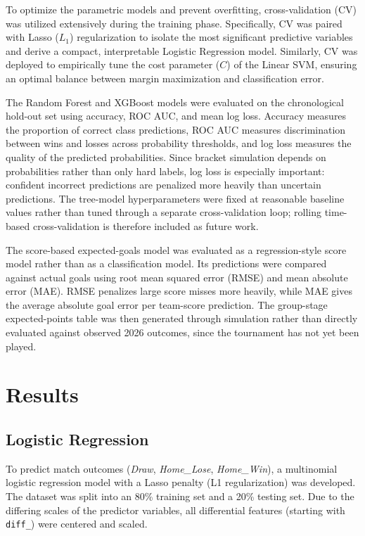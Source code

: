 \documentclass[11pt]{article}
\begin{document}
To optimize the parametric models and prevent overfitting, cross-validation (CV) was utilized extensively during the training phase. Specifically, CV was paired with Lasso ($L_1$) regularization to isolate the most significant predictive variables and derive a compact, interpretable Logistic Regression model. Similarly, CV was deployed to empirically tune the cost parameter ($C$) of the Linear SVM, ensuring an optimal balance between margin maximization and classification error.

The Random Forest and XGBoost models were evaluated on the chronological hold-out set using accuracy, ROC AUC, and mean log loss. Accuracy measures the proportion of correct class predictions, ROC AUC measures discrimination between wins and losses across probability thresholds, and log loss measures the quality of the predicted probabilities. Since bracket simulation depends on probabilities rather than only hard labels, log loss is especially important: confident incorrect predictions are penalized more heavily than uncertain predictions. The tree-model hyperparameters were fixed at reasonable baseline values rather than tuned through a separate cross-validation loop; rolling time-based cross-validation is therefore included as future work.

The score-based expected-goals model was evaluated as a regression-style score model rather than as a classification model. Its predictions were compared against actual goals using root mean squared error (RMSE) and mean absolute error (MAE). RMSE penalizes large score misses more heavily, while MAE gives the average absolute goal error per team-score prediction. The group-stage expected-points table was then generated through simulation rather than directly evaluated against observed 2026 outcomes, since the tournament has not yet been played.

\section{Results}

\subsection{Logistic Regression}

To predict match outcomes (\textit{Draw}, \textit{Home\_Lose}, \textit{Home\_Win}), a multinomial logistic regression model with a Lasso penalty (L1 regularization) was developed. The dataset was split into an 80\% training set and a 20\% testing set. Due to the differing scales of the predictor variables, all differential features (starting with \texttt{diff\_}) were centered and scaled. 
\end{document}
